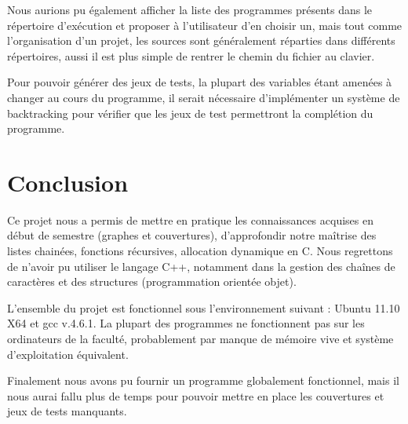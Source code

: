 \documentclass[a4paper,11pt]{article}
\begin{document}
	Nous aurions pu également afficher la liste des programmes présents dans le répertoire d'exécution et proposer à l'utilisateur d'en choisir un, mais tout comme l'organisation d'un projet, les sources sont généralement réparties dans différents répertoires, aussi il est plus simple de rentrer le chemin du fichier au clavier.

	Pour pouvoir générer des jeux de tests, la plupart des variables étant amenées à changer au cours du programme,  il serait nécessaire d'implémenter un système de backtracking pour vérifier que les jeux de test permettront la complétion du programme.
	\section{Conclusion}
		Ce projet nous a permis de mettre en pratique les connaissances acquises en début de semestre (graphes et couvertures), d'approfondir notre maîtrise des listes chainées, fonctions récursives, allocation dynamique en C. Nous regrettons de n'avoir pu utiliser le langage C++, notamment dans la gestion des chaînes de caractères et des structures (programmation orientée objet).
		


L'ensemble du projet est fonctionnel sous l'environnement suivant : Ubuntu 11.10 X64 et gcc v.4.6.1. La plupart des programmes ne fonctionnent pas sur les ordinateurs de la faculté, probablement par manque de mémoire vive et système d'exploitation équivalent.
		
	Finalement nous avons pu fournir un programme globalement fonctionnel, mais il nous aurai fallu plus de temps pour pouvoir mettre en place les couvertures et jeux de tests manquants.

		
\end{document}
